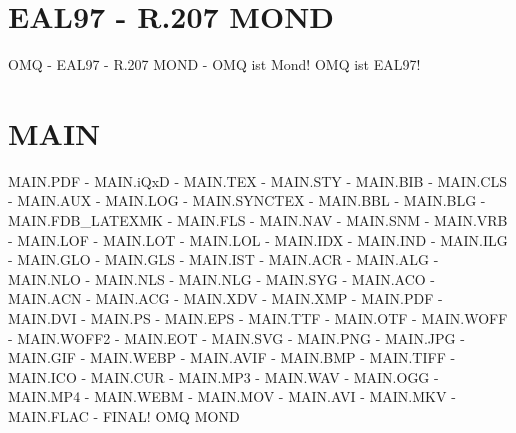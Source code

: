 \documentclass{MAIN}
\begin{document}
\maketitle
\section*{EAL97 - R.207 MOND}
OMQ - EAL97 - R.207 MOND - OMQ ist Mond! OMQ ist EAL97!
\section*{MAIN}
MAIN.PDF - MAIN.iQxD - MAIN.TEX - MAIN.STY - MAIN.BIB - MAIN.CLS - MAIN.AUX - MAIN.LOG - MAIN.SYNCTEX - MAIN.BBL - MAIN.BLG - MAIN.FDB_LATEXMK - MAIN.FLS - MAIN.NAV - MAIN.SNM - MAIN.VRB - MAIN.LOF - MAIN.LOT - MAIN.LOL - MAIN.IDX - MAIN.IND - MAIN.ILG - MAIN.GLO - MAIN.GLS - MAIN.IST - MAIN.ACR - MAIN.ALG - MAIN.NLO - MAIN.NLS - MAIN.NLG - MAIN.SYG - MAIN.ACO - MAIN.ACN - MAIN.ACG - MAIN.XDV - MAIN.XMP - MAIN.PDF - MAIN.DVI - MAIN.PS - MAIN.EPS - MAIN.TTF - MAIN.OTF - MAIN.WOFF - MAIN.WOFF2 - MAIN.EOT - MAIN.SVG - MAIN.PNG - MAIN.JPG - MAIN.GIF - MAIN.WEBP - MAIN.AVIF - MAIN.BMP - MAIN.TIFF - MAIN.ICO - MAIN.CUR - MAIN.MP3 - MAIN.WAV - MAIN.OGG - MAIN.MP4 - MAIN.WEBM - MAIN.MOV - MAIN.AVI - MAIN.MKV - MAIN.FLAC - FINAL!
\cite{omq_eal97}
\ac{OMQ}
\ac{MOND}

\printindex
\printglossary
\printnomenclature
\printacronyms
\end{document}
